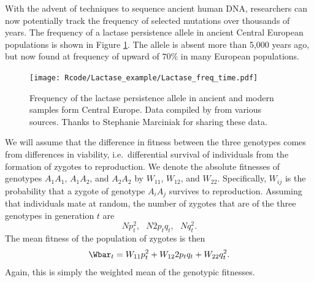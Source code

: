 With the advent of techniques to sequence ancient human DNA, researchers can now potentially track the frequency of selected mutations over thousands of years. The frequency of a lactase persistence allele in ancient Central European populations is shown in Figure \ref{fig:LCT_freqs}. The allele is absent more than 5,000 years ago, but now found at frequency of upward of $70\%$ in many European populations. 


\begin{figure}
\begin{center}
\texttt{[image: Rcode/Lactase\_example/Lactase\_freq\_time.pdf]}
\end{center}
\caption{Frequency of the lactase persistence allele in ancient and
  modern samples form Central Europe. Data compiled by
  \citet{marciniak2017} from various sources. Thanks to Stephanie
  Marciniak for sharing these data. } \label{fig:LCT_freqs}
\end{figure}

We will assume that the difference in fitness between the three
genotypes comes from differences in viability, i.e.\ differential
survival of individuals from the formation of zygotes to reproduction.  
We denote the absolute fitnesses of genotypes $A_1A_1$, $A_1A_2$, and $A_2A_2$ by $W_{11}$, $W_{12}$, and $W_{22}$. Specifically, $W_{ij}$ is the probability that a zygote of genotype $A_iA_j$ survives to reproduction.
Assuming that individuals mate at random, the number of zygotes that
are of the three genotypes in generation $t$ are
\begin{equation}
Np_t^2, ~~~  N2p_tq_t, ~~~ Nq_t^2.
\end{equation}
The mean fitness of the population of zygotes is then
\begin{equation}
	\Wbar_t = W_{11} p_t^2+W_{12} 2p_tq_t  +  W_{22} q_t^2.
\end{equation}
Again, this is simply the weighted mean of the genotypic fitnesses.
\\

